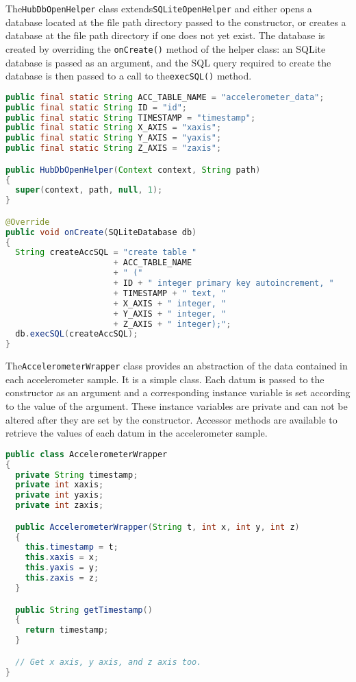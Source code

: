 \documentclass[11pt, a4paper, oneside, english]{scrbook}
\begin{document}
The\lstinline{HubDbOpenHelper} class extends\lstinline{SQLiteOpenHelper} and either opens a database located at the file path directory passed to the constructor, or creates a database at the file path directory if one does not yet exist. The database is created by overriding the \lstinline{onCreate()} method of the helper class: an SQLite database is passed as an argument, and the SQL query required to create the database is then passed to a call to the\lstinline{execSQL()} method.
\begin{lstlisting}[language=Java, numbers=none]
public final static String ACC_TABLE_NAME = "accelerometer_data";
public final static String ID = "id";
public final static String TIMESTAMP = "timestamp";
public final static String X_AXIS = "xaxis";
public final static String Y_AXIS = "yaxis";
public final static String Z_AXIS = "zaxis";

public HubDbOpenHelper(Context context, String path)
{
  super(context, path, null, 1);
}

@Override
public void onCreate(SQLiteDatabase db)
{
  String createAccSQL = "create table "
                      + ACC_TABLE_NAME
                      + " ("
                      + ID + " integer primary key autoincrement, "
                      + TIMESTAMP + " text, "
                      + X_AXIS + " integer, "
                      + Y_AXIS + " integer, "
                      + Z_AXIS + " integer);";
  db.execSQL(createAccSQL);
}
\end{lstlisting}
The\lstinline{AccelerometerWrapper} class provides an abstraction of the data contained in each accelerometer sample. It is a simple class. Each datum is passed to the constructor as an argument and a corresponding instance variable is set according to the value of the argument. These instance variables are private and can not be altered after they are set by the constructor. Accessor methods are available to retrieve the values of each datum in the accelerometer sample.
\begin{lstlisting}[language=Java, numbers=none]
public class AccelerometerWrapper
{
  private String timestamp;
  private int xaxis;
  private int yaxis;
  private int zaxis;

  public AccelerometerWrapper(String t, int x, int y, int z)
  {
    this.timestamp = t;
    this.xaxis = x;
    this.yaxis = y;
    this.zaxis = z;
  }

  public String getTimestamp()
  {
    return timestamp;
  }

  // Get x axis, y axis, and z axis too.
}
\end{lstlisting}
\end{document}
